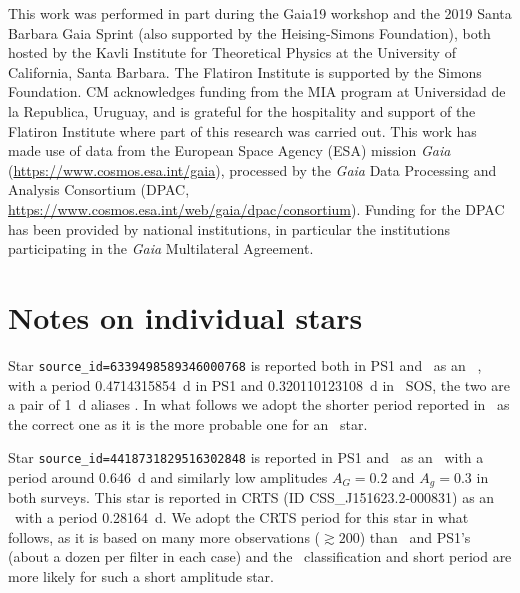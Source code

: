 \documentclass[twocolumn]{aastex63}
\begin{document}
\acknowledgments
This work was performed in part during the Gaia19 workshop and the 2019 Santa Barbara Gaia Sprint (also supported by the Heising-Simons Foundation), both hosted by the Kavli Institute for Theoretical Physics at the University of California, Santa Barbara. The Flatiron Institute is supported by the Simons Foundation. CM acknowledges funding from the MIA program at Universidad de la Republica, Uruguay, and is grateful for the hospitality and support of the Flatiron Institute where part of this research was carried out.
This work has made use of data from the European Space Agency (ESA) mission
{\it Gaia} (\url{https://www.cosmos.esa.int/gaia}), processed by the {\it Gaia}
Data Processing and Analysis Consortium (DPAC,
\url{https://www.cosmos.esa.int/web/gaia/dpac/consortium}). Funding for the DPAC
has been provided by national institutions, in particular the institutions
participating in the {\it Gaia} Multilateral Agreement.

\clearpage
\appendix

\section{Notes on individual stars}


Star \verb+source_id=6339498589346000768+ is reported both in PS1 and \Gaia~as an \rrc~, with a period 0.4714315854~d in PS1 and 0.320110123108~d in \Gaia~SOS, the two are a pair of 1~d aliases \citep[see e.g.]{Lafler1965}. In what follows we adopt the shorter period reported in \Gaia~as the correct one as it is the more probable one for an \rrc~star.

Star \verb+source_id=4418731829516302848+ is reported in PS1 and \Gaia~as an \rrab~with a period around 0.646~d and similarly low amplitudes $A_G=0.2$ and $A_g=0.3$ in both surveys. This star is reported in CRTS \citep{Drake2014} (ID CSS\_J151623.2-000831) as an \rrc~with a period 0.28164~d. We adopt the CRTS period for this star in what follows, as it is based on many more observations ($\gtrsim200$) than \Gaia~and PS1's (about a dozen per filter in each case) and the \rrc~classification and short period are more likely for such a short amplitude star.
\end{document}
